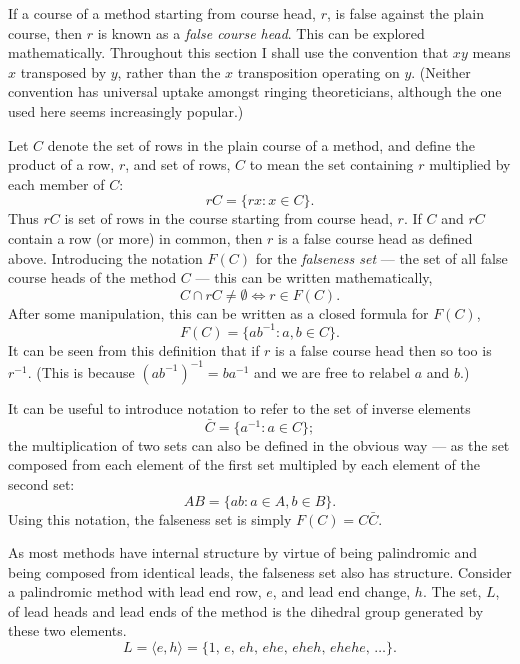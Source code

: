 \documentclass[a4paper,11pt,oneside]{book}
\def\textitidx#1{\textit{#1}\index{#1}}
\begin{document}
If a course of a method starting from course head, $r$, is false against the 
plain course, then $r$ is known as a \textitidx{false course head}.  This 
can be explored mathematically.  Throughout this section I shall use the
convention that $xy$ means $x$ transposed by $y$, rather than the $x$ 
transposition operating on $y$.  (Neither convention has universal uptake
amongst ringing theoreticians, although the one used here seems increasingly
popular.)

Let $C$ denote the set of rows in the plain course of a method, 
and define the product of a row, $r$, and set of rows, $C$ to mean 
the set containing $r$ multiplied by each member of $C$:
\[ rC = \{ r x : x \in C \}. \]
Thus $rC$ is set of rows in the course starting from course head, $r$.
If $C$ and $rC$ contain a row (or more) in common, then $r$ is a false 
course head as defined above.  Introducing the notation $F(C)$ for the 
\textitidx{falseness set} 
--- the set of all false course heads of the method $C$ --- 
this can be written mathematically,
\[ C \cap rC \ne \emptyset \iff r \in F(C). \]
After some manipulation, this can be written as a closed formula for $F(C)$,
\[ F(C) = \{ a b^{-1} : a, b \in C \}. \]
It can be seen from this definition that if $r$ is a false course head then
so too is $r^{-1}$.  (This is because $(a b^{-1})^{-1} = b a^{-1}$ and we
are free to relabel $a$ and $b$.)

It can be useful to introduce notation to refer to the set of inverse elements
\[ \bar{C} = \{ a^{-1} : a \in C \}; \]
the multiplication of two sets can also be defined in the obvious way 
--- as the set composed from each element of the first set multipled by each 
element of the second set: 
\[ AB = \{ a b : a \in A, b \in B \}. \]
Using this notation, the falseness set is simply $F(C) = C\bar{C}$.

As most methods have internal structure by virtue of being palindromic%
 and being composed from identical leads, 
the falseness set also has structure.  
Consider a palindromic method with lead end row, $e$, and lead end change, $h$.
The set, $L$, of lead heads and lead ends of the method is the 
dihedral group generated by these two elements.
\[ L = \langle e, h \rangle 
     = \{ 1,\, e,\, eh,\, ehe,\, eheh,\, ehehe,\, \ldots \}. \]
\end{document}
